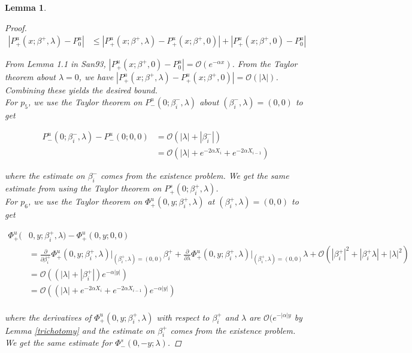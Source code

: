 \documentclass[12pt]{article}
\newtheorem{lemma}{Lemma}
\begin{document}
\begin{lemma}
\begin{proof}
\begin{align*}
|P^u_+(x; \beta^+, \lambda) - P_0^u| 
&\leq |P^u_+(x; \beta^+, \lambda) - P^u_+(x; \beta^+, 0)| + |P^u_+(x; \beta^+, 0) - P_0^u| 
\end{align*}

From Lemma 1.1 in San93, $|P^u_+(x; \beta^+, 0) - P_0^u| = \mathcal{O}(e^{-\alpha x})$. From the Taylor theorem about $\lambda = 0$, we have $|P^u_+(x; \beta^+, \lambda) - P^u_+(x; \beta^+, 0)| = \mathcal{O}(|\lambda|)$. Combining these yields the desired bound.\\

For $p_5$, we use the Taylor theorem on $P^u_-(0; \beta_i^-, \lambda)$ about $(\beta_i^-, \lambda) = (0, 0)$ to get 

\begin{align*}
P^u_-(0; \beta_i^-, \lambda) - P^u_-(0; 0, 0) &= \mathcal{O}(|\lambda| + |\beta_i^-|) \\
&= \mathcal{O}(|\lambda| + e^{-2 \alpha X_i} + e^{-2 \alpha X_{i-1}})
\end{align*}

where the estimate on $\beta_i^-$ comes from the existence problem. We get the same estimate from using the Taylor theorem on $P^s_+(0; \beta_i^+, \lambda)$.\\

For $p_6$, we use the Taylor theorem on $\Phi^u_+(0, y; \beta_i^+, \lambda)$ at $(\beta_i^+, \lambda) = (0, 0)$ to get 

\begin{align*}
\Phi^u_+(&0, y; \beta_i^+, \lambda) - \Phi^u_+(0, y; 0, 0) \\
&= \frac{\partial}{\partial \beta_i^+}\Phi^u_+(0, y; \beta_i^+, \lambda)\Big|_{(\beta_i^+, \lambda) = (0, 0)} \beta_i^+ + \frac{\partial}{\partial \lambda}\Phi^u_+(0, y; \beta_i^+, \lambda)\Big|_{(\beta_i^+, \lambda) = (0, 0)} \lambda + \mathcal{O}(|\beta_i^+|^2 + |\beta_i^+ \lambda| + |\lambda|^2) \\
&= \mathcal{O}((|\lambda| + |\beta_i^+|)e^{-\alpha |y| }) \\
&= \mathcal{O}((|\lambda| + e^{-2 \alpha X_i} + e^{-2 \alpha X_{i-1}})e^{-\alpha |y| }) \\
\end{align*}

where the derivatives of $\Phi^u_+(0, y; \beta_i^+, \lambda)$ with respect to $\beta_i^+$ and $\lambda$ are $\mathcal{O}(e^{-|\alpha|y}$ by Lemma \ref{trichotomy} and the estimate on $\beta_i^+$ comes from the existence problem. We get the same estimate for $\Phi^s_-(0, -y; \lambda)$.

\end{proof}
\end{lemma}
\end{document}
